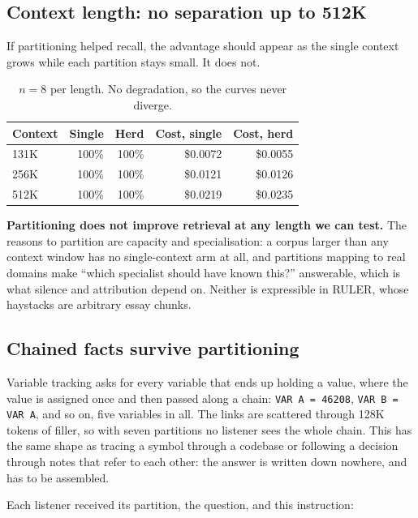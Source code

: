 \documentclass[11pt]{article}
\begin{document}
\subsection{Context length: no separation up to 512K}\label{sec:length}

If partitioning helped recall, the advantage should appear as the single context grows
while each partition stays small. It does not.

\begin{table}[h]
\centering
\begin{tabular}{lrrrr}
\toprule
Context & Single & Herd & Cost, single & Cost, herd \\
\midrule
131K & 100\% & 100\% & \$0.0072 & \$0.0055 \\
256K & 100\% & 100\% & \$0.0121 & \$0.0126 \\
512K & 100\% & 100\% & \$0.0219 & \$0.0235 \\
\bottomrule
\end{tabular}
\caption{$n=8$ per length. No degradation, so the curves never diverge.}
\end{table}

\textbf{Partitioning does not improve retrieval at any length we can test.} The reasons
to partition are capacity and specialisation: a corpus larger than any context window
has no single-context arm at all, and partitions mapping to real domains make ``which
specialist should have known this?'' answerable, which is what silence and attribution
depend on. Neither is expressible in RULER, whose haystacks are arbitrary essay chunks.

\subsection{Chained facts survive partitioning}\label{sec:models}

Variable tracking asks for every variable that ends up holding a value, where the value
is assigned once and then passed along a chain: \texttt{VAR A = 46208},
\texttt{VAR B = VAR A}, and so on, five variables in all. The links are scattered
through 128K tokens of filler, so with seven partitions no listener sees the whole
chain. This has the same shape as tracing a symbol through a codebase or following a
decision through notes that refer to each other: the answer is written down nowhere,
and has to be assembled.

Each listener received its partition, the question, and this instruction:
\end{document}
